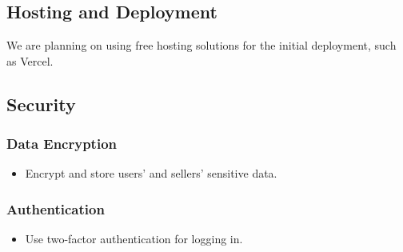 \subsection{Hosting and Deployment}
We are planning on using free hosting solutions for the initial deployment, such as Vercel.

\subsection{Security}

\subsubsection{Data Encryption}
\begin{itemize}
  \item Encrypt and store users' and sellers' sensitive data.
\end{itemize}

\subsubsection{Authentication}
\begin{itemize}
  \item Use two-factor authentication for logging in.
\end{itemize}
